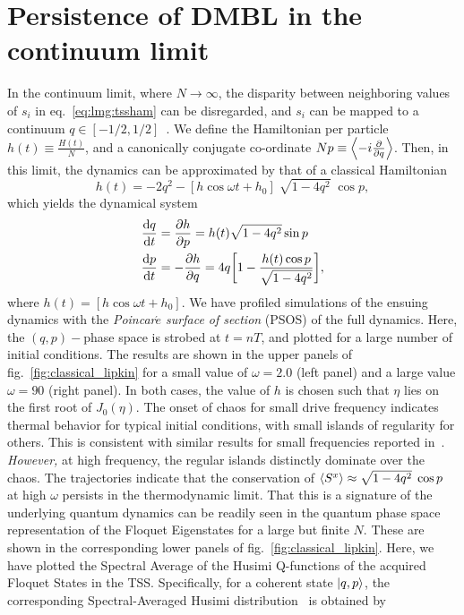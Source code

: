 \documentclass[%
reprint,
superscriptaddress,
amsmath,amssymb,
aps,
prb,
showkeys,
]{revtex4-2}
\begin{document}
\section{\label{sec:level4}Persistence of DMBL in the continuum limit}
In the continuum limit, where $N\rightarrow\infty$, the disparity between neighboring values of $s_i$ in eq.~\ref{eq:lmg:tssham} can be disregarded, and $s_i$ can be mapped to a continuum $q\in \left[-1/2, 1/2\right]$~\cite{mori_prethermalization_2019}. We define	the Hamiltonian per particle $h(t)\equiv \frac{H(t)}{N}$, and a canonically conjugate co-ordinate $Np\equiv \expval{-i\pdv{}{q}}$. Then, in this limit, the dynamics can be approximated by that of a classical Hamiltonian~\cite{sciolla_quantum_2010}
\begin{equation}
	h(t) = -2 q^2 - \left[h\cos{\omega t} + h_0\right]\;\sqrt{1-4q^2}\;\cos{p},
	\label{eq:class:ham}
\end{equation}
which yields the dynamical system 
\begin{align}
	\dv{q}{t} &= \pdv{h}{p} = h(t)\sqrt{1-4q^2}\sin{p}\nonumber \\
	\dv{p}{t} &= -\pdv{h}{q} = 4q\bigg[1-\frac{h(t)\cos{p}}{\sqrt{1-4q^2}}\bigg],
	\label{eq:class:poinc}
\end{align}
where $h(t) = \left[h\cos{\omega t} + h_0\right]$. We have profiled simulations of the ensuing dynamics with the \emph{Poincar$\acute{e}$ surface of section} (PSOS) of the full dynamics. Here, the $\left(q,p\right)-$phase space is strobed at $t=nT$, and plotted for a large number of initial conditions. The results are shown in the upper panels of fig.~\ref{fig:classical_lipkin} for a small value of $\omega=2.0$ (left panel) and a large value $\omega=90$ (right panel). In both cases, the value of $h$ is chosen such that $\eta$ lies on the first root of $J_0(\eta)$. The onset of chaos for small drive frequency indicates thermal behavior for typical initial conditions, with small islands of regularity for others. This is consistent with similar results for small frequencies reported in~\cite{russomanno_thermalization_2015, Kidd2019}. \emph{However,} at high frequency, the regular islands distinctly dominate over the chaos. The trajectories indicate that the conservation of $\expval{S^x}\approx \sqrt{1-4q^2}\;\cos{p}$~\cite{mori_prethermalization_2019} at high $\omega$ persists in the thermodynamic limit.
That this is a signature of the underlying quantum dynamics can be readily seen in the quantum phase space representation of the Floquet Eigenstates for a large but finite $N$. These are shown in the corresponding lower panels of fig.~\ref{fig:classical_lipkin}. Here, we have plotted the Spectral Average of the Husimi Q-functions of the acquired Floquet States in the TSS. Specifically, for a coherent state $\ket{q,p}$, the corresponding Spectral-Averaged Husimi distribution~\cite{husimi} is obtained by 
\end{document}
